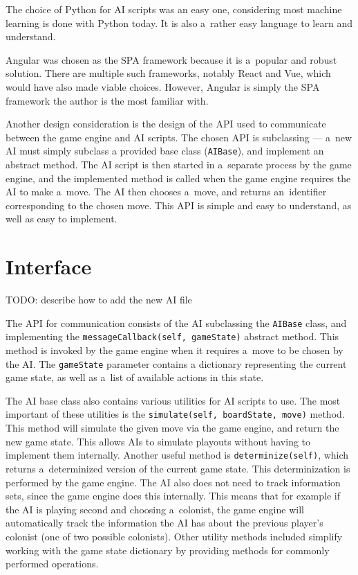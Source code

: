 The choice of Python for AI scripts was an easy one, considering most machine learning
is done with Python today. It is also a~rather easy language to learn and understand.

Angular was chosen as the SPA framework because it is a~popular and robust solution.
There are multiple such frameworks, notably React and Vue, which would have also
made viable choices. However, Angular is simply the SPA framework the author
is the most familiar with.

Another design consideration is the design of the API used to communicate between
the game engine and AI scripts. The chosen API is subclassing --- a~new AI
must simply subclass a provided base class (\texttt{AIBase}), and implement
an abstract method. The AI script is then started in a~separate process
by the game engine, and the implemented method is called when the game engine
requires the AI to make a~move. The AI then chooses a~move, and returns an~identifier
corresponding to the chosen move. This API is simple and easy to understand,
as well as easy to implement.

\section{Interface}

TODO: describe how to add the new AI file

The API for communication consists of the AI subclassing the \texttt{AIBase} class,
and implementing the \texttt{messageCallback(self, gameState)} abstract method. This method
is invoked by the game engine when it requires a~move to be chosen by the AI. The
\texttt{gameState} parameter contains a dictionary representing the current game state,
as well as a~list of available actions in this state.

The AI base class also contains various utilities for AI scripts to use. The most
important of these utilities is the \texttt{simulate(self, boardState, move)} method.
This method will simulate the given move via the game engine, and return the new game state.
This allows AIs to simulate playouts without having to implement them internally.
Another useful method is \texttt{determinize(self)}, which returns a~determinized
version of the current game state. This determinization is performed by the game
engine. The AI also does not need to track information sets, since the game engine
does this internally. This means that for example if the AI is playing second and
choosing a~colonist, the game engine will automatically track the information the AI
has about the previous player's colonist (one of two possible colonists).
Other utility methods included simplify working with the game state dictionary by
providing methods for commonly performed operations.

